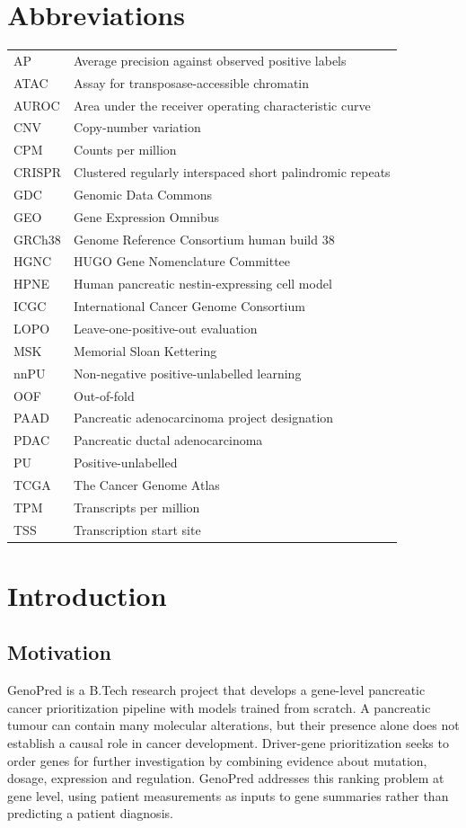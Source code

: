 \documentclass[12pt,a4paper,oneside]{report}
\renewcommand{\headrulewidth}{0.35pt}
\begin{document}
\chapter*{Abbreviations}
\begin{tabularx}{\linewidth}{lY}
\toprule
AP & Average precision against observed positive labels\\
ATAC & Assay for transposase-accessible chromatin\\
AUROC & Area under the receiver operating characteristic curve\\
CNV & Copy-number variation\\
CPM & Counts per million\\
CRISPR & Clustered regularly interspaced short palindromic repeats\\
GDC & Genomic Data Commons\\
GEO & Gene Expression Omnibus\\
GRCh38 & Genome Reference Consortium human build 38\\
HGNC & HUGO Gene Nomenclature Committee\\
HPNE & Human pancreatic nestin-expressing cell model\\
ICGC & International Cancer Genome Consortium\\
LOPO & Leave-one-positive-out evaluation\\
MSK & Memorial Sloan Kettering\\
nnPU & Non-negative positive-unlabelled learning\\
OOF & Out-of-fold\\
PAAD & Pancreatic adenocarcinoma project designation\\
PDAC & Pancreatic ductal adenocarcinoma\\
PU & Positive-unlabelled\\
TCGA & The Cancer Genome Atlas\\
TPM & Transcripts per million\\
TSS & Transcription start site\\
\bottomrule
\end{tabularx}

\clearpage
{}
\pagestyle{fancy}
\fancyhf{}
\fancyhead[L]{\small\nouppercase{\leftmark}}
\fancyfoot[C]{\thepage}
\renewcommand{\headrulewidth}{0.35pt}
\chapter{Introduction}
\section{Motivation}
GenoPred is a B.Tech research project that develops a gene-level pancreatic cancer prioritization pipeline with models trained from scratch. A pancreatic tumour can contain many molecular alterations, but their presence alone does not establish a causal role in cancer development. Driver-gene prioritization seeks to order genes for further investigation by combining evidence about mutation, dosage, expression and regulation. GenoPred addresses this ranking problem at gene level, using patient measurements as inputs to gene summaries rather than predicting a patient diagnosis.
\end{document}
